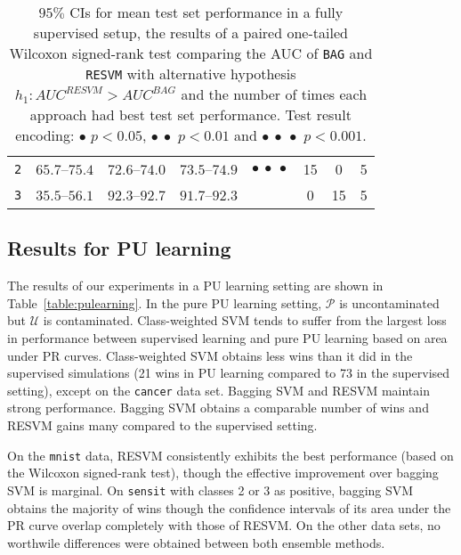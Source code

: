 \documentclass[preprint,elsarticle-num,12pt]{elsarticle}
\newcommand{\resvm}{RESVM}
\begin{document}
\begin{table}[!h]
\begin{tabular}{cccccccc}
\texttt{2} & $65.7$--$75.4$ & $72.6$--$74.0$ & $73.5$--$74.9$ & $\bullet\ \bullet\ \bullet$ & 15 & 0 & 5\\ 
\texttt{3} & $35.5$--$56.1$ & $92.3$--$92.7$ & $91.7$--$92.3$ &  & 0 & 15 & 5\\ 
\bottomrule
\end{tabular}
\caption{$95\%$ CIs for mean test set performance in a fully supervised setup, the results of a paired one-tailed Wilcoxon signed-rank test comparing the AUC of \texttt{BAG} and \texttt{\resvm} with alternative hypothesis $h_1: AUC^{\resvm} > AUC^{BAG}$ and the number of times each approach had best test set performance.
Test result encoding: $\bullet$ $p < 0.05$, $\bullet\ \bullet$ $p < 0.01$ and $\bullet\ \bullet\ \bullet$ $p < 0.001$.
}
\label{table:supervised}
\end{table}



\subsection{Results for PU learning}
The results of our experiments in a PU learning setting are shown in Table~\ref{table:pulearning}. In the pure PU learning setting, $\mathcal{P}$ is uncontaminated but $\mathcal{U}$ is contaminated. Class-weighted SVM tends to suffer from the largest loss in performance between supervised learning and pure PU learning based on area under PR curves. Class-weighted SVM obtains less wins than it did in the supervised simulations (21 wins in PU learning compared to 73 in the supervised setting), except on the \texttt{cancer} data set. Bagging SVM and RESVM maintain strong performance. Bagging SVM obtains a comparable number of wins and RESVM gains many compared to the supervised setting.

On the \texttt{mnist} data, RESVM consistently exhibits the best performance (based on the Wilcoxon signed-rank test), though the effective improvement over bagging SVM is marginal. On \texttt{sensit} with classes 2 or 3 as positive, bagging SVM obtains the majority of wins though the confidence intervals of its area under the PR curve overlap completely with those of RESVM. On the other data sets, no worthwile differences were obtained between both ensemble methods.
\end{document}
